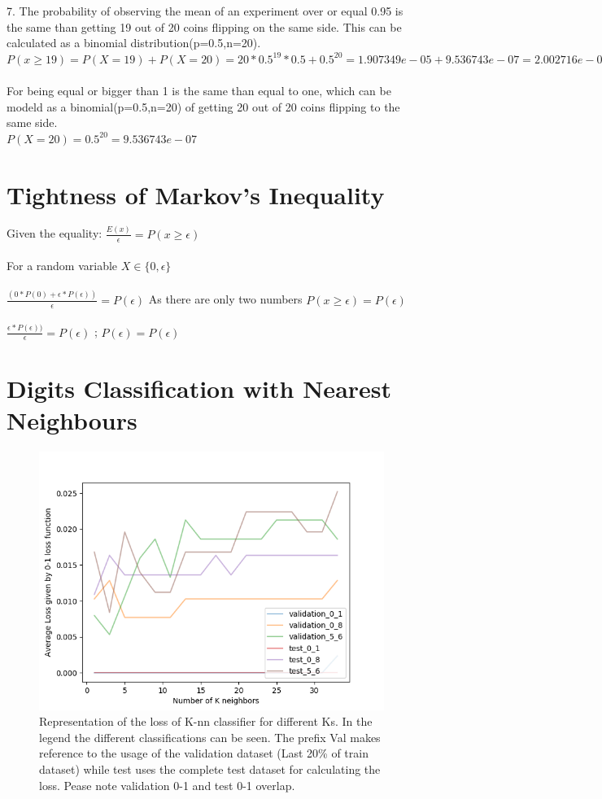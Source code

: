 \documentclass[a4paper]{article}
\begin{document}
7. The probability of observing the mean of an experiment over or equal 0.95 is the same than getting 19 out of 20 coins flipping on the same side. This can be calculated as a binomial distribution(p=0.5,n=20).\\
$ P(x \geq 19) = P(X=19) + P(X=20) = 20*0.5^{19}*0.5 + 0.5^{20}= 1.907349e-05 + 9.536743e-07 = 2.002716e-05$\\\\
For being equal or bigger than 1 is the same than equal to one, which can be modeld as a binomial(p=0.5,n=20) of getting 20 out of 20 coins flipping to the same side. \\
$ P(X=20) = 0.5^{20} = 9.536743e-07$

\section{Tightness of Markov's Inequality}
Given the equality:
$\frac{E(x)}{\epsilon} = P(x\geq\epsilon)$ \\\\
For a random variable $X\in\{0,\epsilon\}$ \\\\
$\frac{(0*P(0) + \epsilon*P(\epsilon))}{\epsilon} = P(\epsilon)$ 
As there are only two numbers $P(x\geq\epsilon) = P(\epsilon) $ \\\\
$\frac{\epsilon*P(\epsilon))}{\epsilon} = P(\epsilon)$ ; 
$P(\epsilon)= P(\epsilon)$

\section{Digits Classification with Nearest Neighbours}

\begin{figure}[H]
	\centering
	\includegraphics[width=\textwidth]{code/loss_knn_plot}
	\caption{Representation of the loss of K-nn classifier for different Ks. In the legend the different classifications can be seen. The prefix Val makes reference to the usage of the validation dataset (Last 20\% of train dataset) while test uses the complete test dataset for calculating the loss. Pease note validation 0-1 and test 0-1 overlap.}
	\label{fig:plot_error}
\end{figure}
\end{document}
